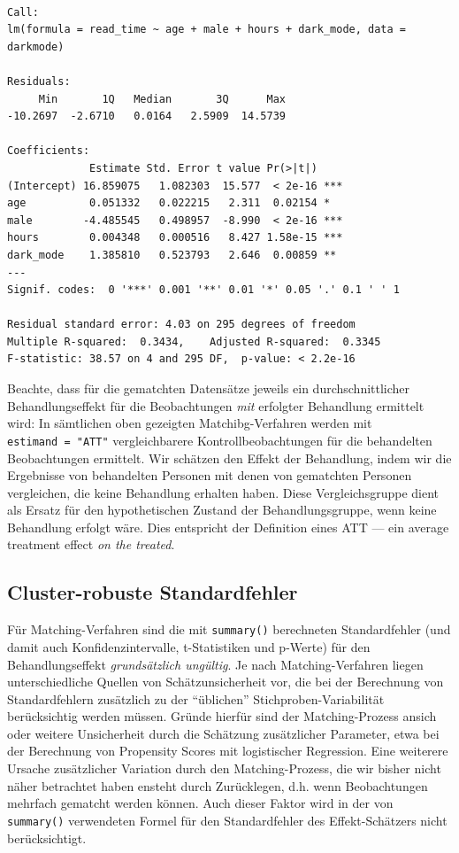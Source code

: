 \documentclass[
  a4paper,
  DIV=11,
  oneside]{scrreprt}
\begin{document}
\begin{verbatim}

Call:
lm(formula = read_time ~ age + male + hours + dark_mode, data = darkmode)

Residuals:
     Min       1Q   Median       3Q      Max 
-10.2697  -2.6710   0.0164   2.5909  14.5739 

Coefficients:
             Estimate Std. Error t value Pr(>|t|)    
(Intercept) 16.859075   1.082303  15.577  < 2e-16 ***
age          0.051332   0.022215   2.311  0.02154 *  
male        -4.485545   0.498957  -8.990  < 2e-16 ***
hours        0.004348   0.000516   8.427 1.58e-15 ***
dark_mode    1.385810   0.523793   2.646  0.00859 ** 
---
Signif. codes:  0 '***' 0.001 '**' 0.01 '*' 0.05 '.' 0.1 ' ' 1

Residual standard error: 4.03 on 295 degrees of freedom
Multiple R-squared:  0.3434,    Adjusted R-squared:  0.3345 
F-statistic: 38.57 on 4 and 295 DF,  p-value: < 2.2e-16
\end{verbatim}

Beachte, dass für die gematchten Datensätze jeweils ein
durchschnittlicher Behandlungseffekt für die Beobachtungen \emph{mit}
erfolgter Behandlung ermittelt wird: In sämtlichen oben gezeigten
Matchibg-Verfahren werden mit \texttt{estimand\ =\ "ATT"}
vergleichbarere Kontrollbeobachtungen für die behandelten Beobachtungen
ermittelt. Wir schätzen den Effekt der Behandlung, indem wir die
Ergebnisse von behandelten Personen mit denen von gematchten Personen
vergleichen, die keine Behandlung erhalten haben. Diese Vergleichsgruppe
dient als Ersatz für den hypothetischen Zustand der Behandlungsgruppe,
wenn keine Behandlung erfolgt wäre. Dies entspricht der Definition eines
ATT --- ein average treatment effect \emph{on the treated}.

\hypertarget{cluster-robuste-standardfehler}{%
\subsection{Cluster-robuste
Standardfehler}\label{cluster-robuste-standardfehler}}

Für Matching-Verfahren sind die mit \texttt{summary()} berechneten
Standardfehler (und damit auch Konfidenzintervalle, t-Statistiken und
p-Werte) für den Behandlungseffekt \emph{grundsätzlich ungültig}. Je
nach Matching-Verfahren liegen unterschiedliche Quellen von
Schätzunsicherheit vor, die bei der Berechnung von Standardfehlern
zusätzlich zu der ``üblichen'' Stichproben-Variabilität berücksichtig
werden müssen. Gründe hierfür sind der Matching-Prozess ansich oder
weitere Unsicherheit durch die Schätzung zusätzlicher Parameter, etwa
bei der Berechnung von Propensity Scores mit logistischer Regression.
Eine weiterere Ursache zusätzlicher Variation durch den
Matching-Prozess, die wir bisher nicht näher betrachtet haben ensteht
durch Zurücklegen, d.h. wenn Beobachtungen mehrfach gematcht werden
können. Auch dieser Faktor wird in der von \texttt{summary()}
verwendeten Formel für den Standardfehler des Effekt-Schätzers nicht
berücksichtigt.
\end{document}
